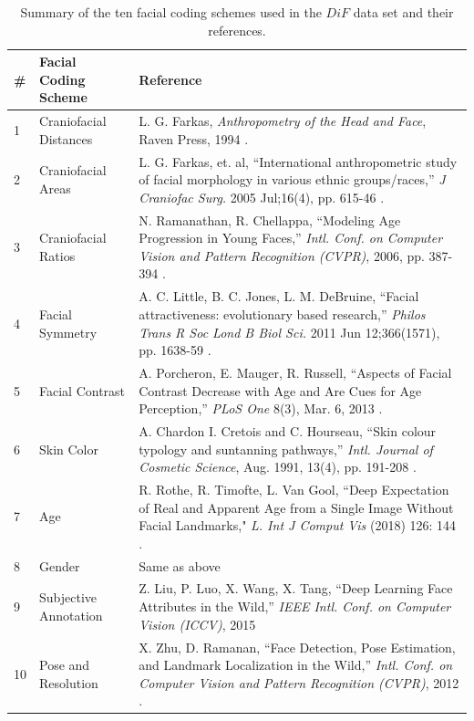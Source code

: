 \documentclass[letterpaper,11pt]{article}
\begin{document}
\begin{table}[ht]
\begin{tabular}[ht!]{|m{.2in}|m{1.7in}|m{4in}|} \hline
  \bf \# & \bf Facial Coding Scheme & \bf Reference \\ \hline 
    \hline
  1 &  Craniofacial Distances & L. G. Farkas, {\it Anthropometry of the Head and Face}, Raven Press, 1994 \cite{anthropometry_book94}. \\
    \hline
  2 &   Craniofacial Areas & L. G. Farkas, et. al, ``International anthropometric study of facial morphology in various ethnic groups/races,'' {\it J Craniofac Surg.} 2005 Jul;16(4), pp. 615-46 \cite{anthropmetry05}.\\
    \hline
  3 &    Craniofacial Ratios&N. Ramanathan, R. Chellappa, ``Modeling Age Progression in Young Faces,'' {\it Intl. Conf. on Computer Vision and Pattern Recognition (CVPR)}, 2006, pp. 387-394 \cite{face_age_modeling06}. \\
    \hline
  4 &  Facial Symmetry & A. C. Little, B. C. Jones, L. M. DeBruine, ``Facial attractiveness: evolutionary based research,'' {\it Philos Trans R Soc Lond B Biol Sci.} 2011 Jun 12;366(1571), pp. 1638-59 \cite{facial_attractiveness11}. \\
    \hline
  5 &  Facial Contrast & A. Porcheron, E. Mauger, R. Russell, ``Aspects of Facial Contrast Decrease with Age and Are Cues for Age Perception,'' {\it PLoS One} 8(3), Mar. 6, 2013 \cite{facial_contrast17}. \\
    \hline
  6 &  Skin Color & A. Chardon I. Cretois and C. Hourseau, ``Skin colour typology and suntanning pathways,'' {\it Intl. Journal of Cosmetic Science}, Aug. 1991, 13(4), pp. 191-208 \cite{ita_ijcs1991}. \\
   \hline %
 7 &  Age  & R. Rothe, R. Timofte, L. Van Gool, ``Deep Expectation of Real and Apparent Age from a Single Image Without Facial Landmarks," {\it L. Int J Comput Vis} (2018) 126: 144 \cite{age_image18}. \\
   \hline
 8 &   Gender & Same as above\\
   \hline
 9 & Subjective Annotation & Z. Liu, P. Luo, X. Wang, X. Tang, ``Deep Learning Face Attributes in the Wild,'' {\it IEEE Intl. Conf. on Computer Vision (ICCV)}, 2015 \cite{CelebA_ICCV15}  \\ 
 \hline 
  10 & Pose and Resolution & X. Zhu, D. Ramanan, ``Face Detection, Pose Estimation, and Landmark Localization in the Wild,'' {\it Intl. Conf. on Computer Vision and Pattern Recognition (CVPR)}, 2012 \cite{face_detection_cvpr12}. \\
   \hline
   \end{tabular}
\caption{Summary of the ten facial coding schemes used in the $DiF$ data set and their references.}\label{tab:coding_schemes}
\end{table}
\end{document}
